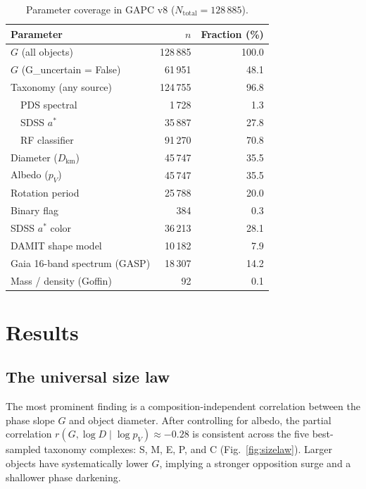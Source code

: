 \documentclass{aa}
\newcommand{\gapc}{GAPC\xspace}
\begin{document}
\begin{table}
\centering
\caption{Parameter coverage in \gapc v8 ($N_\mathrm{total} = 128\,885$).}
\label{tab:coverage}
\begin{tabular}{lrr}
\toprule
Parameter & $n$ & Fraction (\%) \\
\midrule
$G$ (all objects)            & 128\,885 & 100.0 \\
$G$ (G\_uncertain = False)   &  61\,951 &  48.1 \\
Taxonomy (any source)        & 124\,755 &  96.8 \\
\ \ PDS spectral             &   1\,728 &   1.3 \\
\ \ SDSS $a^*$               &  35\,887 &  27.8 \\
\ \ RF classifier            &  91\,270 &  70.8 \\
Diameter ($D_\mathrm{km}$)   &  45\,747 &  35.5 \\
Albedo ($p_V$)               &  45\,747 &  35.5 \\
Rotation period              &  25\,788 &  20.0 \\
Binary flag                  &     384  &   0.3 \\
SDSS $a^*$ color             &  36\,213 &  28.1 \\
DAMIT shape model            &  10\,182 &   7.9 \\
Gaia 16-band spectrum (GASP) &  18\,307 &  14.2 \\
Mass / density (Goffin)      &      92  &   0.1 \\
\bottomrule
\end{tabular}
\end{table}


\section{Results}
\label{sec:results}

\subsection{The universal size law}
\label{sec:sizelaw}

The most prominent finding is a composition-independent correlation between
the phase slope $G$ and object diameter.  After controlling for albedo,
the partial correlation $r(G,\log D \mid \log p_V) \approx -0.28$ is
consistent across the five best-sampled taxonomy complexes: S, M, E, P,
and C (Fig.~\ref{fig:sizelaw}).  Larger objects have systematically lower
$G$, implying a stronger opposition surge and a shallower phase darkening.
\end{document}
